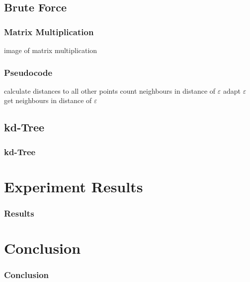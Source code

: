 \documentclass{beamer}
\begin{document}
\subsection*{Brute Force}

\begin{frame}
	\frametitle{Matrix Multiplication}
	image of matrix multiplication
\end{frame}

\begin{frame}
	\frametitle{Pseudocode}
	\begin{algorithmic}
			\STATE calculate distances to all other points
			\REPEAT
				\STATE count neighbours in distance of $\varepsilon$
				\STATE adapt $\varepsilon$
			\STATE get neighbours in distance of $\varepsilon$
		\ENDFOR
	\end{algorithmic}
\end{frame}

\subsection*{kd-Tree}

\begin{frame}
	\frametitle{kd-Tree}
\end{frame}

\section{Experiment Results}

\begin{frame}
	\frametitle{Results}
\end{frame}

\section{Conclusion}

\begin{frame}
	\frametitle{Conclusion}
\end{frame}
\end{document}
